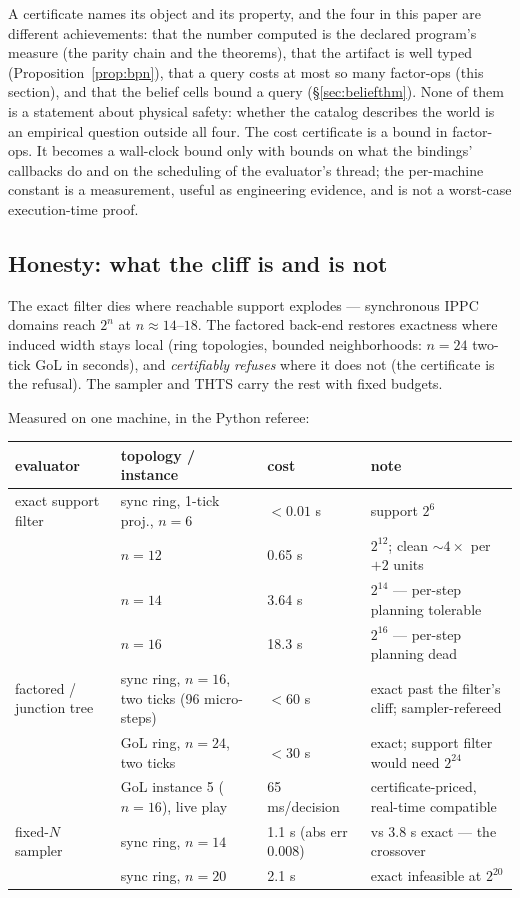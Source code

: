 \documentclass[11pt]{article}
\theoremstyle{plain}
\theoremstyle{definition}
\theoremstyle{remark}
\begin{document}
A certificate names its object and its property, and the four in this
paper are different achievements: that the number computed is the
declared program's measure (the parity chain and the theorems), that
the artifact is well typed (Proposition~\ref{prop:bpn}), that a query
costs at most so many factor-ops (this section), and that the belief
cells bound a query (\S\ref{sec:beliefthm}). None of them is a
statement about physical safety: whether the catalog describes the
world is an empirical question outside all four. The cost certificate
is a bound in factor-ops. It becomes a wall-clock bound only with
bounds on what the bindings' callbacks do and on the scheduling of the
evaluator's thread; the per-machine constant is a measurement, useful
as engineering evidence, and is not a worst-case execution-time proof.

\subsection{Honesty: what the cliff is and is not}\label{sec:cliff}

The exact filter dies where reachable support explodes --- synchronous
IPPC domains reach $2^n$ at $n \approx 14$--$18$. The factored back-end
restores exactness where induced width stays local (ring topologies,
bounded neighborhoods: $n = 24$ two-tick GoL in seconds), and
\emph{certifiably refuses} where it does not (the certificate is the
refusal). The sampler and THTS carry the rest with fixed budgets.

Measured on one machine, in the Python referee:

\begin{center}\small
\begin{tabular}{llll}
\toprule
evaluator & topology / instance & cost & note \\
\midrule
exact support filter & sync ring, 1-tick proj., $n=6$ & $<0.01$ s &
support $2^6$ \\
 & $n=12$ & 0.65 s & $2^{12}$; clean $\sim 4\times$ per $+2$ units \\
 & $n=14$ & 3.64 s & $2^{14}$ --- per-step planning tolerable \\
 & $n=16$ & 18.3 s & $2^{16}$ --- per-step planning dead \\
\addlinespace
factored / junction tree & sync ring, $n=16$, two ticks (96
micro-steps) & $<60$ s & exact past the filter's cliff;
sampler-refereed \\
 & GoL ring, $n=24$, two ticks & $<30$ s & exact; support filter would
need $2^{24}$ \\
 & GoL instance 5 ($n=16$), live play & 65 ms/decision &
certificate-priced, real-time compatible \\
\addlinespace
fixed-$N$ sampler & sync ring, $n=14$ & 1.1 s (abs err 0.008) & vs 3.8
s exact --- the crossover \\
 & sync ring, $n=20$ & 2.1 s & exact infeasible at $2^{20}$ \\
\bottomrule
\end{tabular}
\end{center}
\end{document}
